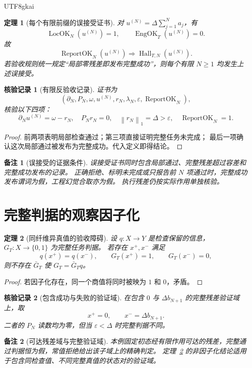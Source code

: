 \documentclass[12pt,a4paper,openany]{report}
\newtheorem{theorem}{定理}[chapter]
\newtheorem{remark}{备注}[chapter]
\newtheorem{Certificate}{核验记录}[chapter]
\numberwithin{equation}{chapter}
\newcommand{\LocOK}{\operatorname{LocOK}}
\newcommand{\EngOK}{\operatorname{EngOK}}
\newcommand{\ReportOK}{\operatorname{ReportOK}}
\newcommand{\Hall}{\operatorname{Hall}}
\newcommand{\Norm}[1]{\left\lVert#1\right\rVert}
\begin{document}
\begin{CJK*}{UTF8}{gkai}
\begin{theorem}[每个有限前缀的误接受证书]
\label{thm:hallucination}
对 $u^{(N)}=\Delta\sum_{j=1}^Na_j$，有
\[
 \LocOK_N(u^{(N)})=1,\qquad \EngOK_T(u^{(N)})=0.
\]
故
\[
 \ReportOK_N(u^{(N)})\Longrightarrow\Hall_{T,N}(u^{(N)}).
\]
若验收规则统一规定“局部零残差即发布完整成功”，则每个有限 $N\ge1$ 均发生上述误接受。
\end{theorem}
\begin{Certificate}[有限反验收记录]
证书为
\[
 (\partial_N,P_N,\omega,u^{(N)},r_N,\lambda_N,\varepsilon,
   \ReportOK_N),
\]
核验以下四项：
\[
 \partial_Nu^{(N)}=\omega-r_N,\quad P_Nr_N=0,\quad
 \Norm{r_N}_1=\Delta>\varepsilon,\quad \ReportOK_N=1.
\]
\end{Certificate}
\begin{proof}
前两项表明局部检查通过；第三项直接证明完整任务未完成；
最后一项确认这次局部通过被发布为完整成功。代入定义即得结论。
\end{proof}

\begin{remark}[误接受的证据条件]
误接受证书同时包含局部通过、完整残差超过容差和完整成功发布的记录。
正确拒绝、标明未完成或只报告前 $N$ 项通过时，完整成功发布谓词为假，工程幻觉合取亦为假。
执行残差仍按实际作用单独核验。
\end{remark}

\section{完整判据的观察因子化}

\begin{theorem}[同纤维异真值的验收障碍]
\label{thm:validator}
设 $q:X\to Y$ 是检查保留的信息，$G_T:X\to\{0,1\}$ 为完整任务判据。
若存在 $x^+,x^-$ 满足
\[
 q(x^+)=q(x^-),\qquad G_T(x^+)=1,\qquad G_T(x^-)=0,
\]
则不存在 $\bar G_T$ 使 $G_T=\bar G_Tq$。
\end{theorem}
\begin{proof}
若因子化存在，同一个商值将同时被映为 $1$ 和 $0$，矛盾。
\end{proof}

\begin{Certificate}[包含成功与失败的验证域]
在包含 $0$ 与 $\Delta b_{N+1}$ 的完整残差验证域上，取
\[
 x^+=0,\qquad x^-=\Delta b_{N+1}.
\]
二者的 $P_N$ 读数均为零，但当 $\varepsilon<\Delta$ 时完整判据不同。
\end{Certificate}

\begin{remark}[可达残差域与完整验证域]
本例固定初态经有限作用可达的残差，完整通过判据恒为假，常值拒绝给出该子域上的精确判定。
定理~\ref{thm:validator} 的非因子化结论适用于包含同检查值、不同完整真值的状态对的验证域。
\end{remark}


\end{CJK*}
\end{document}
